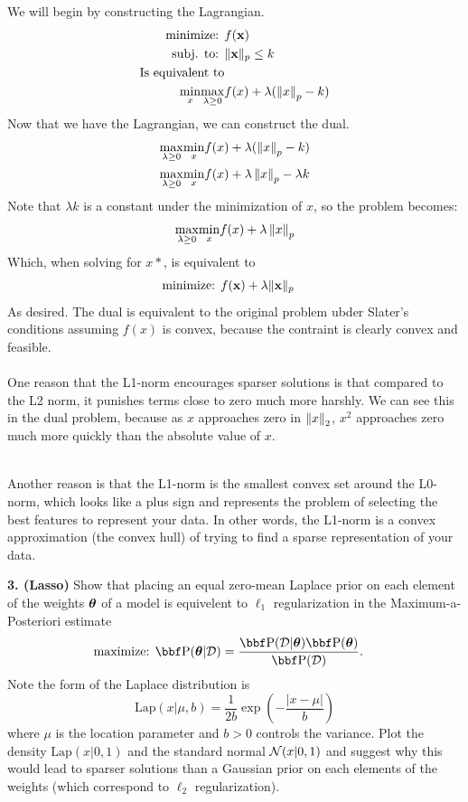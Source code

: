 \documentclass[12pt,letterpaper,fleqn]{hmcpset}
\begin{document}
We will begin by constructing the Lagrangian.
\begin{align*}
     \text{minimize: } & f({\bf x}) \\
     \text{subj. to: } & \|{\bf x}\|_p \leq k \\
     \text{Is equivalent to}\\    
     \underset{x}{\min}\underset{\lambda \geq 0}{\max} & f(x) + \lambda(\left\lVert x\right\rVert_p - k) \\
\end{align*}
Now that we have the Lagrangian, we can construct the dual. 
\begin{align*}
    \underset{\lambda \geq 0}{\max} \underset{x}{\min}& f(x) + \lambda(\left\lVert x\right\rVert_p - k) \\
    \underset{\lambda \geq 0}{\max} \underset{x}{\min}& f(x) + \lambda \left\lVert x\right\rVert_p - \lambda k \\
\end{align*}
Note that $\lambda k$ is a constant under the minimization of $x$, so the problem becomes:
    $$\underset{\lambda \geq 0}{\max}  \underset{x}{\min} f(x) + \lambda \left\lVert x\right\rVert_p$$
Which, when solving for $x*$, is equivalent to 
\begin{align*}
    \text{minimize: } & f({\bf x}) + \lambda\|{\bf x}\|_p
\end{align*}
As desired. The dual is equivalent to the original problem ubder Slater's conditions assuming $f(x)$ is convex, because the contraint is clearly convex and feasible. \\\\

One reason that the L1-norm encourages sparser solutions is that compared to the L2 norm, it punishes terms close to zero much more harshly. We can see this in the dual problem, because as $x$ approaches zero in $\left\lVert x\right\rVert_2$, $x^2$ approaches zero much more quickly than the absolute value of $x$.\\\

Another reason is that the L1-norm is the smallest convex set around the L0-norm, which looks like a plus sign and represents the problem of selecting the best features to represent your data. In other words, the L1-norm is a convex approximation (the convex hull) of trying to find a sparse representation of your data.

\newpage

\textbf{3. (Lasso)} Show that placing an equal zero-mean Laplace prior on each element of the weights $\hbox{\boldmath$\theta$}$
of a model is equivelent to $\ell_1$ regularization in the Maximum-a-Posteriori estimate
\begin{align*}
    \text{maximize: } & \PP(\thetab | \Dc) = \frac{\PP(\Dc | \thetab)\PP(\thetab)}{\PP(\Dc)}.
\end{align*}
Note the form of the Laplace distribution is
\[
    \mathrm{Lap}(x|\mu,b) = \frac{1}{2b}\exp\left(-\frac{|x-\mu|}{b}\right)
\]
where $\mu$ is the location parameter and $b>0$ controls the variance. Plot the density
$\mathrm{Lap}(x|0,1)$ and the standard normal ${\cal N}(x|0,1)$ and suggest why this would
lead to sparser solutions than a Gaussian prior on each elements of the weights
(which correspond to $\ell_2$ regularization).\\[1em]
\end{document}
